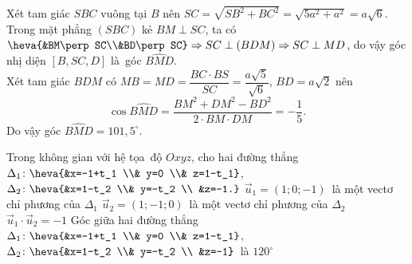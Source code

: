 \begin{ex}
{\begin{itemchoice}
			Xét tam giác $SBC$ vuông tại  $B$ nên $SC=\sqrt{SB^2+BC^2}=\sqrt{5a^2+a^2}=a\sqrt{6}$.\\
			Trong mặt phẳng $(SBC)$  kẻ $BM\perp SC$, ta có $\heva{&BM\perp SC\\&BD\perp SC}\Rightarrow SC\perp(BDM)\Rightarrow SC\perp MD$, do vậy góc nhị diện $[B,SC,D]$ là~góc $\widehat{BMD}$.\\
			Xét tam giác $BDM$ có $MB=MD=\dfrac{BC\cdot BS}{SC}=\dfrac{a\sqrt{5}}{\sqrt{6}}$, $BD=a\sqrt{2}$ nên $$\cos\widehat{BMD}=\dfrac{BM^2+DM^2-BD^2}{2\cdot  BM\cdot DM}=-\dfrac{1}{5}.$$
			Do vậy  góc $\widehat{BMD}=101{,}5^{\circ}$.
		\end{itemchoice}
	} 
\end{ex}

\begin{ex}%
	 Trong không gian với hệ tọa~độ $Oxyz$, cho hai đường thẳng $\Delta_1\colon\heva{&x=-1+t_1 \\& y=0 \\& z=1-t_1}$, $\Delta_2\colon\heva{&x=1-t_2 \\& y=-t_2 \\ &z=-1.}$
	\choiceTF 
		{\True$\overrightarrow{u}_1=(1; 0; -1)$~là một vectơ chỉ phương của $\Delta_1$} 
		{$\overrightarrow{u}_2=(1; -1; 0)$~là một vectơ chỉ phương của $\Delta_2$} 
		{\True$\overrightarrow{u}_1 \cdot \overrightarrow{u}_2=-1$} 
		{Góc giữa  hai đường thẳng $\Delta_1\colon\heva{&x=-1+t_1 \\& y=0 \\& z=1-t_1}$, $\Delta_2\colon\heva{&x=1-t_2 \\& y=-t_2 \\ &z=-1}$~là $120^\circ$}
\end{ex}

